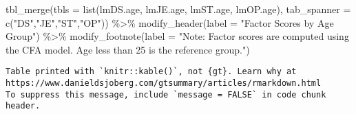\documentclass[
  letterpaper,
  DIV=11,
  numbers=noendperiod]{scrartcl}
\newenvironment{Shaded}{\begin{snugshade}}{\end{snugshade}}
\newcommand{\AttributeTok}[1]{\textcolor[rgb]{0.40,0.45,0.13}{#1}}
\newcommand{\FunctionTok}[1]{\textcolor[rgb]{0.28,0.35,0.67}{#1}}
\newcommand{\NormalTok}[1]{\textcolor[rgb]{0.00,0.23,0.31}{#1}}
\newcommand{\SpecialCharTok}[1]{\textcolor[rgb]{0.37,0.37,0.37}{#1}}
\newcommand{\StringTok}[1]{\textcolor[rgb]{0.13,0.47,0.30}{#1}}
\begin{document}
\begin{Shaded}
\begin{Highlighting}[]
\FunctionTok{tbl\_merge}\NormalTok{(}\AttributeTok{tbls =} \FunctionTok{list}\NormalTok{(lmDS.age, lmJE.age, lmST.age, lmOP.age),}
          \AttributeTok{tab\_spanner =} \FunctionTok{c}\NormalTok{(}\StringTok{"DS"}\NormalTok{,}\StringTok{"JE"}\NormalTok{,}\StringTok{"ST"}\NormalTok{,}\StringTok{"OP"}\NormalTok{)) }\SpecialCharTok{\%\textgreater{}\%}
  \FunctionTok{modify\_header}\NormalTok{(}\AttributeTok{label =} \StringTok{"Factor Scores by Age Group"}\NormalTok{) }\SpecialCharTok{\%\textgreater{}\%}
  \FunctionTok{modify\_footnote}\NormalTok{(}\AttributeTok{label =} \StringTok{"Note: Factor scores are computed using the CFA model.  Age less than 25 is the reference group."}\NormalTok{)}
\end{Highlighting}
\end{Shaded}

\begin{verbatim}
Table printed with `knitr::kable()`, not {gt}. Learn why at
https://www.danieldsjoberg.com/gtsummary/articles/rmarkdown.html
To suppress this message, include `message = FALSE` in code chunk header.
\end{verbatim}
\end{document}
